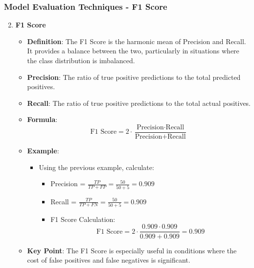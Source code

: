 \documentclass[aspectratio=169]{beamer}
\begin{document}
\begin{frame}[fragile]
    \frametitle{Model Evaluation Techniques - F1 Score}
    \begin{enumerate}
        \setcounter{enumi}{1} %
        \item \textbf{F1 Score}
        \begin{itemize}
            \item \textbf{Definition}: The F1 Score is the harmonic mean of Precision and Recall. It provides a balance between the two, particularly in situations where the class distribution is imbalanced.
            \item \textbf{Precision}: The ratio of true positive predictions to the total predicted positives.
            \item \textbf{Recall}: The ratio of true positive predictions to the total actual positives.
            \item \textbf{Formula}:
            \begin{equation}
            \text{F1 Score} = 2 \cdot \frac{\text{Precision} \cdot \text{Recall}}{\text{Precision} + \text{Recall}}
            \end{equation}
            \item \textbf{Example}:
            \begin{itemize}
                \item Using the previous example, calculate:
                \begin{itemize}
                    \item Precision = $\frac{TP}{TP + FP} = \frac{50}{50 + 5} = 0.909$
                    \item Recall = $\frac{TP}{TP + FN} = \frac{50}{50 + 5} = 0.909$
                    \item F1 Score Calculation:
                    \begin{equation}
                    \text{F1 Score} = 2 \cdot \frac{0.909 \cdot 0.909}{0.909 + 0.909} = 0.909
                    \end{equation}
                \end{itemize}
            \end{itemize}
            \item \textbf{Key Point}: The F1 Score is especially useful in conditions where the cost of false positives and false negatives is significant.
        \end{itemize}
    \end{enumerate}
\end{frame}
\end{document}
